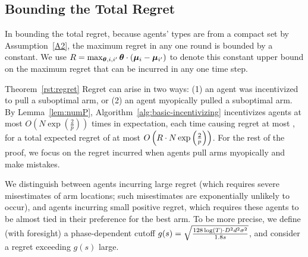 \subsection{Bounding the Total Regret}
In bounding the total regret, because agents' types are from a compact
set by Assumption~\ref{A2}, the maximum regret in any one round is
bounded by a constant.
We use $R = \max_{\bm{\theta}, i,i'} \bm{\theta} \cdot (\bm{\mu}_{i} - \bm{\mu}_{i'})$
to denote this constant upper bound on the maximum regret that can be
incurred in any one time step. 


\begin{emptyextraproof}{Theorem~\ref{rst:regret}}
Regret can arise in two ways:
(1) an agent was incentivized to pull a suboptimal arm, or
(2) an agent myopically pulled a suboptimal arm.
By Lemma~\ref{lem:numP}, Algorithm~\ref{alg:basic-incentivizing}
incentivizes agents at most 
$O\left( N\exp\left(\frac{2}{p}\right) \right)$
times in expectation, each time causing regret at most \MAXR,
for a total expected regret of at most
$O\left(R\cdot N\exp\left(\frac{2}{p}\right) \right)$.
For the rest of the proof, we focus on the regret incurred when agents
pull arms myopically and make mistakes.

We distinguish between agents incurring large regret
(which requires severe misestimates of arm locations;
such misestimates are exponentially unlikely to occur), 
and agents incurring small positive regret,
which requires these agents to be almost tied in their preference for
the best arm.
To be more precise, we define (with foresight) a phase-dependent
cutoff
$g(s) = \sqrt{\frac{128\log(T) \cdot D^2 d^2 \sigma^2}{1.8 s}}$,
and consider a regret exceeding $g(s)$ large.



\end{emptyextraproof}
